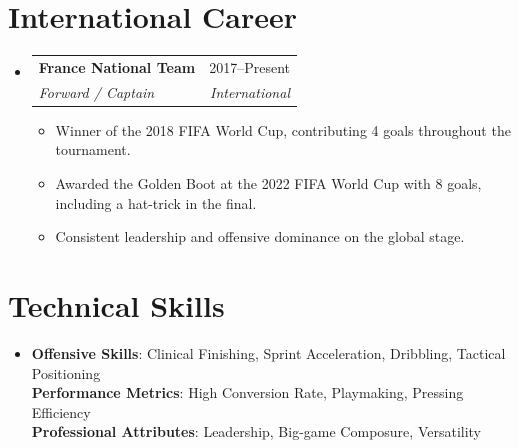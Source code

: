 \documentclass[letterpaper,11pt]{article}
\makeatletter
\newcommand{\resumeItem}[1]{
\item\small{
{#1 \vspace{-2pt}}
}
}
\newcommand{\resumeSubheading}[4]{
\vspace{-2pt}\item
\begin{tabular*}{0.97\textwidth}[t]{l@{\extracolsep{\fill}}r}
\textbf{#1} & #2 \\
\textit{\small#3} & \textit{\small #4} \\
\end{tabular*}\vspace{-7pt}
}
\newcommand{\resumeSubHeadingListStart}{\begin{itemize}[leftmargin=0.15in, label={}]}
\newcommand{\resumeSubHeadingListEnd}{\end{itemize}}
\newcommand{\resumeItemListStart}{\begin{itemize}}
\newcommand{\resumeItemListEnd}{\end{itemize}\vspace{-5pt}}
\makeatother
\begin{document}
\section{International Career}
\resumeSubHeadingListStart
\resumeSubheading{France National Team}{2017--Present}{Forward / Captain}{International}
\resumeItemListStart
\resumeItem{Winner of the 2018 FIFA World Cup, contributing 4 goals throughout the tournament.}
\resumeItem{Awarded the Golden Boot at the 2022 FIFA World Cup with 8 goals, including a hat-trick in the final.}
\resumeItem{Consistent leadership and offensive dominance on the global stage.}
\resumeItemListEnd
\resumeSubHeadingListEnd

\section{Technical Skills}
\begin{itemize}[leftmargin=0.15in, label={}]
\item{
\textbf{Offensive Skills}{: Clinical Finishing, Sprint Acceleration, Dribbling, Tactical Positioning} \\
\textbf{Performance Metrics}{: High Conversion Rate, Playmaking, Pressing Efficiency} \\
\textbf{Professional Attributes}{: Leadership, Big-game Composure, Versatility}
}
\end{itemize}
\end{document}
